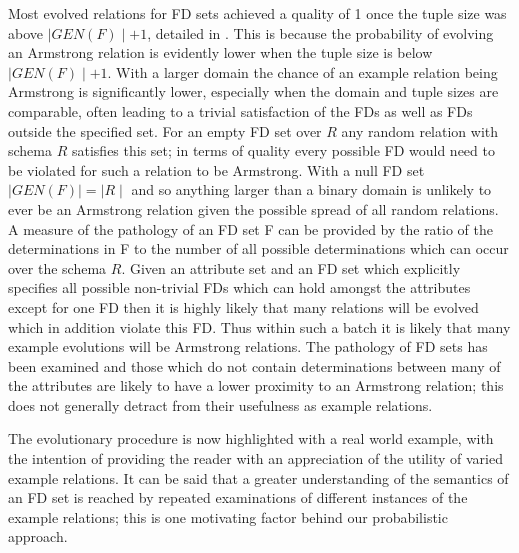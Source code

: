 Most evolved relations for FD sets achieved a quality of 1 once the
tuple size was above $\mid GEN(F) \mid + 1$, detailed in \cite{cl96}.
 This is because the probability
of evolving an Armstrong relation is evidently lower when the tuple size
 is below
$\mid GEN(F) \mid + 1$. With a larger domain the chance of an example
relation being Armstrong is significantly lower, especially when the
domain and tuple sizes are comparable, often leading to a trivial
satisfaction of the FDs as well as FDs outside the specified set.
For an empty FD set over $R$ any random relation with schema $R$ satisfies this set;
in terms of quality every possible FD would need to be violated for such
a relation to be Armstrong.
 With a null FD set $\mid GEN(F) \mid = \mid R \mid$ and so
anything larger than a binary domain is unlikely to ever be an Armstrong
relation given the possible spread of all random relations. A measure
of the pathology of an FD set F can be
 provided by the ratio
of the determinations in F to the number of all possible determinations
which can occur over the schema $R$.
Given an attribute set and an FD set
which explicitly specifies all possible non-trivial FDs which
can hold amongst the attributes except for one FD then it is highly likely that
many relations will be evolved which in addition violate this FD. Thus within
such a batch it is likely that many example evolutions will be Armstrong
relations. The
pathology of FD sets has been examined and those which do not 
contain determinations between many of the attributes are
likely to have a lower proximity to an Armstrong relation; this does
not generally detract from their usefulness as example relations.

\medskip

The evolutionary procedure is now highlighted with a real world 
example, with the intention of providing the reader with an 
appreciation of the utility of varied example relations. It
can be said that a greater understanding of the semantics of 
an FD set
is reached by repeated examinations of different instances of the
example relations; this is one motivating factor behind our probabilistic approach.

